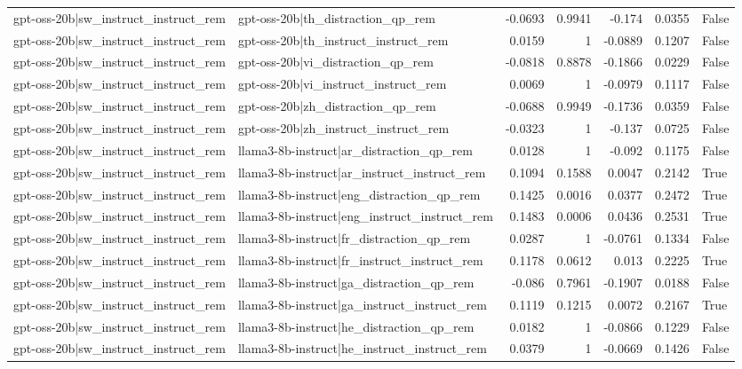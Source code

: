 \begin{table}
\begin{tabular}{l l r r r r l}
gpt-oss-20b|sw_instruct_instruct_rem & gpt-oss-20b|th_distraction_qp_rem & -0.0693 & 0.9941 & -0.174 & 0.0355 & False \\
gpt-oss-20b|sw_instruct_instruct_rem & gpt-oss-20b|th_instruct_instruct_rem & 0.0159 & 1 & -0.0889 & 0.1207 & False \\
gpt-oss-20b|sw_instruct_instruct_rem & gpt-oss-20b|vi_distraction_qp_rem & -0.0818 & 0.8878 & -0.1866 & 0.0229 & False \\
gpt-oss-20b|sw_instruct_instruct_rem & gpt-oss-20b|vi_instruct_instruct_rem & 0.0069 & 1 & -0.0979 & 0.1117 & False \\
gpt-oss-20b|sw_instruct_instruct_rem & gpt-oss-20b|zh_distraction_qp_rem & -0.0688 & 0.9949 & -0.1736 & 0.0359 & False \\
gpt-oss-20b|sw_instruct_instruct_rem & gpt-oss-20b|zh_instruct_instruct_rem & -0.0323 & 1 & -0.137 & 0.0725 & False \\
gpt-oss-20b|sw_instruct_instruct_rem & llama3-8b-instruct|ar_distraction_qp_rem & 0.0128 & 1 & -0.092 & 0.1175 & False \\
gpt-oss-20b|sw_instruct_instruct_rem & llama3-8b-instruct|ar_instruct_instruct_rem & 0.1094 & 0.1588 & 0.0047 & 0.2142 & True \\
gpt-oss-20b|sw_instruct_instruct_rem & llama3-8b-instruct|eng_distraction_qp_rem & 0.1425 & 0.0016 & 0.0377 & 0.2472 & True \\
gpt-oss-20b|sw_instruct_instruct_rem & llama3-8b-instruct|eng_instruct_instruct_rem & 0.1483 & 0.0006 & 0.0436 & 0.2531 & True \\
gpt-oss-20b|sw_instruct_instruct_rem & llama3-8b-instruct|fr_distraction_qp_rem & 0.0287 & 1 & -0.0761 & 0.1334 & False \\
gpt-oss-20b|sw_instruct_instruct_rem & llama3-8b-instruct|fr_instruct_instruct_rem & 0.1178 & 0.0612 & 0.013 & 0.2225 & True \\
gpt-oss-20b|sw_instruct_instruct_rem & llama3-8b-instruct|ga_distraction_qp_rem & -0.086 & 0.7961 & -0.1907 & 0.0188 & False \\
gpt-oss-20b|sw_instruct_instruct_rem & llama3-8b-instruct|ga_instruct_instruct_rem & 0.1119 & 0.1215 & 0.0072 & 0.2167 & True \\
gpt-oss-20b|sw_instruct_instruct_rem & llama3-8b-instruct|he_distraction_qp_rem & 0.0182 & 1 & -0.0866 & 0.1229 & False \\
gpt-oss-20b|sw_instruct_instruct_rem & llama3-8b-instruct|he_instruct_instruct_rem & 0.0379 & 1 & -0.0669 & 0.1426 & False \\

\end{tabular}
\end{table}
